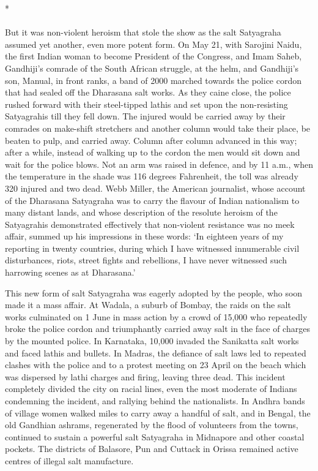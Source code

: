 \begin{multicols}{2}
\begin{center}*\end{center}

\paragraph*{}

But it was non-violent heroism that stole the show as the salt Satyagraha assumed yet another, even more potent form. On May 21, with Sarojini Naidu, the first Indian woman to become President of the Congress, and Imam Saheb, Gandhiji's comrade of the South African struggle, at the helm, and Gandhiji's son, Manual, in front ranks, a band of 2000 marched towards the police cordon that had sealed off the Dharasana salt works. As they caine close, the police rushed forward with their steel-tipped lathis and set upon the non-resisting Satyagrahis till they fell down. The injured would be carried away by their comrades on make-shift stretchers and another column would take their place, be beaten to pulp, and carried away. Column after column advanced in this way; after a while, instead of walking up to the cordon the men would sit down and wait for the police blows. Not an arm was raised in defence, and by 11 a.m., when the temperature in the shade was 116 degrees Fahrenheit, the toll was already 320 injured and two dead. Webb Miller, the American journalist, whose account of the Dharasana Satyagraha was to carry the flavour of Indian nationalism to many distant lands, and whose description of the resolute heroism of the Satyagrahis demonstrated effectively that non-violent resistance was no meek affair, summed up his impressions in these words: `In eighteen years of my reporting in twenty countries, during which I have witnessed innumerable civil disturbances, riots, street fights and rebellions, I have never witnessed such harrowing scenes as at Dharasana.'

This new form of salt Satyagraha was eagerly adopted by the people, who soon made it a mass affair. At Wadala, a suburb of Bombay, the raids on the salt works culminated on 1 June in mass action by a crowd of 15,000 who repeatedly broke the police cordon and triumphantly carried away salt in the face of charges by the mounted police. In Karnataka, 10,000 invaded the Sanikatta salt works and faced lathis and bullets. In Madras, the defiance of salt laws led to repeated clashes with the police and to a protest meeting on 23 April on the beach which was dispersed by lathi charges and firing, leaving three dead. This incident completely divided the city on racial lines, even the most moderate of Indians condemning the incident, and rallying behind the nationalists. In Andhra bands of village women walked miles to carry away a handful of salt, and in Bengal, the old Gandhian ashrams, regenerated by the flood of volunteers from the towns, continued to sustain a powerful salt Satyagraha in Midnapore and other coastal pockets. The districts of Balasore, Pun and Cuttack in Orissa remained active centres of illegal salt manufacture.


\end{multicols}
